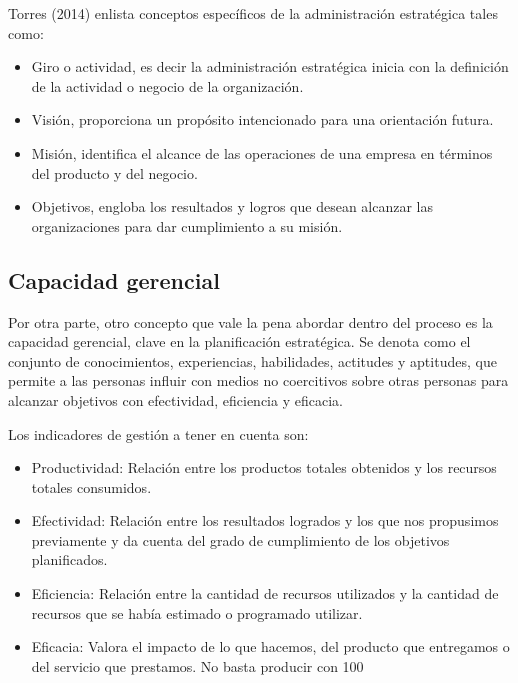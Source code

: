 Torres (2014) enlista conceptos específicos de la administración estratégica tales como:
\begin{itemize}
	\item Giro o actividad, es decir la administración estratégica inicia con la definición de la actividad o negocio de la organización.
	\item Visión, proporciona un propósito intencionado para una orientación futura.
	\item Misión, identifica el alcance de las operaciones de una empresa en términos del producto y del negocio.
	\item Objetivos, engloba los resultados y logros que desean alcanzar las organizaciones para dar cumplimiento a su misión.
\end{itemize}


\subsection{Capacidad gerencial}
Por otra parte, otro concepto que vale la pena abordar dentro del proceso es la capacidad gerencial, clave en la planificación estratégica. Se denota como el conjunto de conocimientos, experiencias, habilidades, actitudes y aptitudes, que permite a las personas influir con medios no coercitivos sobre otras personas para alcanzar objetivos con efectividad, eficiencia y eficacia.

Los indicadores de gestión a tener en cuenta son:

\begin{itemize}
	\item Productividad: Relación entre los productos totales obtenidos y los recursos totales consumidos.
	\item Efectividad: Relación entre los resultados logrados y los que nos propusimos previamente y da cuenta del grado de cumplimiento de los objetivos planificados.
	\item Eficiencia: Relación entre la cantidad de recursos utilizados y la cantidad de recursos que se había estimado o programado utilizar.
	\item Eficacia: Valora el impacto de lo que hacemos, del producto que entregamos o del servicio que prestamos. No basta producir con 100%
\end{itemize}

